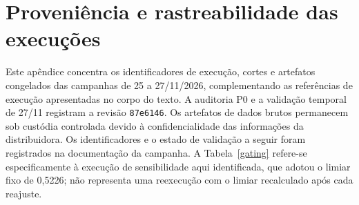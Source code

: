 \chapter{Proveniência e rastreabilidade das execuções}\label{ap:proveniencia}

Este apêndice concentra os identificadores de execução, cortes e artefatos congelados das campanhas de 25 a 27/11/2026, complementando as referências de execução apresentadas no corpo do texto. A auditoria P0 e a validação temporal de 27/11 registram a revisão \texttt{87e6146}. Os artefatos de dados brutos permanecem sob custódia controlada devido à confidencialidade das informações da distribuidora. Os identificadores e o estado de validação a seguir foram registrados na documentação da campanha. A Tabela~\ref{gating} refere-se especificamente à execução de sensibilidade aqui identificada, que adotou o limiar fixo de 0,5226; não representa uma reexecução com o limiar recalculado após cada reajuste.

